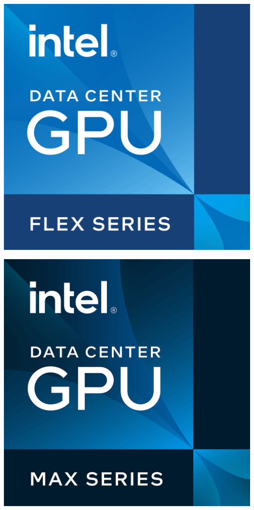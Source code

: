 \documentclass[a4paper]{article}
\begin{document}
    \begin{minipage}{.18\textwidth}
        \includegraphics[width=\textwidth]{img/data_center_gpu_flex_series_logo.png}
    \end{minipage}
    \begin{minipage}{.18\textwidth}
        \includegraphics[width=\textwidth]{img/data_center_gpu_max_series_logo.png}
    \end{minipage}
\end{document}
